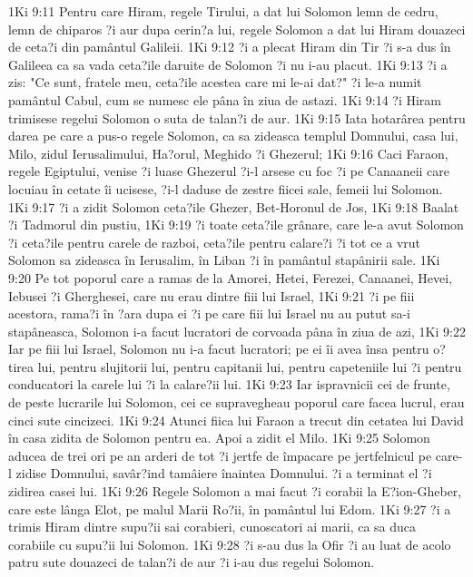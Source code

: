 1Ki 9:11  Pentru care Hiram, regele Tirului, a dat lui Solomon lemn de cedru, lemn de chiparos ?i aur dupa cerin?a lui, regele Solomon a dat lui Hiram douazeci de ceta?i din pamântul Galileii.
1Ki 9:12  ?i a plecat Hiram din Tir ?i s-a dus în Galileea ca sa vada ceta?ile daruite de Solomon ?i nu i-au placut.
1Ki 9:13  ?i a zis: "Ce sunt, fratele meu, ceta?ile acestea care mi le-ai dat?" ?i le-a numit pamântul Cabul, cum se numesc ele pâna în ziua de astazi.
1Ki 9:14  ?i Hiram trimisese regelui Solomon o suta de talan?i de aur.
1Ki 9:15  Iata hotarârea pentru darea pe care a pus-o regele Solomon, ca sa zideasca templul Domnului, casa lui, Milo, zidul Ierusalimului, Ha?orul, Meghido ?i Ghezerul;
1Ki 9:16  Caci Faraon, regele Egiptului, venise ?i luase Ghezerul ?i-l arsese cu foc ?i pe Canaaneii care locuiau în cetate îi ucisese, ?i-l daduse de zestre fiicei sale, femeii lui Solomon.
1Ki 9:17  ?i a zidit Solomon ceta?ile Ghezer, Bet-Horonul de Jos,
1Ki 9:18  Baalat ?i Tadmorul din pustiu,
1Ki 9:19  ?i toate ceta?ile grânare, care le-a avut Solomon ?i ceta?ile pentru carele de razboi, ceta?ile pentru calare?i ?i tot ce a vrut Solomon sa zideasca în Ierusalim, în Liban ?i în pamântul stapânirii sale.
1Ki 9:20  Pe tot poporul care a ramas de la Amorei, Hetei, Ferezei, Canaanei, Hevei, Iebusei ?i Gherghesei, care nu erau dintre fiii lui Israel,
1Ki 9:21  ?i pe fiii acestora, rama?i în ?ara dupa ei ?i pe care fiii lui Israel nu au putut sa-i stapâneasca, Solomon i-a facut lucratori de corvoada pâna în ziua de azi,
1Ki 9:22  Iar pe fiii lui Israel, Solomon nu i-a facut lucratori; pe ei îi avea însa pentru o?tirea lui, pentru slujitorii lui, pentru capitanii lui, pentru capeteniile lui ?i pentru conducatori la carele lui ?i la calare?ii lui.
1Ki 9:23  Iar ispravnicii cei de frunte, de peste lucrarile lui Solomon, cei ce supravegheau poporul care facea lucrul, erau cinci sute cincizeci.
1Ki 9:24  Atunci fiica lui Faraon a trecut din cetatea lui David în casa zidita de Solomon pentru ea. Apoi a zidit el Milo.
1Ki 9:25  Solomon aducea de trei ori pe an arderi de tot ?i jertfe de împacare pe jertfelnicul pe care-l zidise Domnului, savâr?ind tamâiere înaintea Domnului. ?i a terminat el ?i zidirea casei lui.
1Ki 9:26  Regele Solomon a mai facut ?i corabii la E?ion-Gheber, care este lânga Elot, pe malul Marii Ro?ii, în pamântul lui Edom.
1Ki 9:27  ?i a trimis Hiram dintre supu?ii sai corabieri, cunoscatori ai marii, ca sa duca corabiile cu supu?ii lui Solomon.
1Ki 9:28  ?i s-au dus la Ofir ?i au luat de acolo patru sute douazeci de talan?i de aur ?i i-au dus regelui Solomon.
